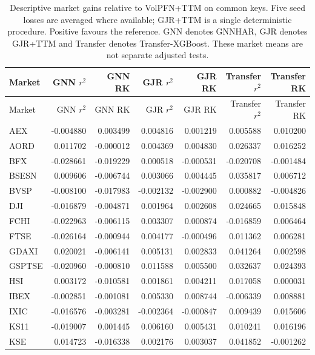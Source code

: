 \begingroup\footnotesize\setlength{\tabcolsep}{3pt}
\begin{longtable}{@{}lrrrrrr@{}}
\caption[Realised-risk gains by market]{Descriptive market gains relative to VolPFN+TTM on common keys. Five seed losses are averaged where available; GJR+TTM is a single deterministic procedure. Positive favours the reference. GNN denotes GNNHAR, GJR denotes GJR+TTM and Transfer denotes Transfer-XGBoost. These market means are not separate adjusted tests.}\label{tab:new-intraday-markets}\\
\toprule
Market & GNN $r^2$ & GNN RK & GJR $r^2$ & GJR RK & Transfer $r^2$ & Transfer RK \\
\midrule\endfirsthead
\toprule
Market & GNN $r^2$ & GNN RK & GJR $r^2$ & GJR RK & Transfer $r^2$ & Transfer RK \\
\midrule\endhead
AEX & -0.004880 & 0.003499 & 0.004816 & 0.001219 & 0.005588 & 0.010200 \\
AORD & 0.011702 & -0.000012 & 0.004369 & 0.004830 & 0.026337 & 0.016252 \\
BFX & -0.028661 & -0.019229 & 0.000518 & -0.000531 & -0.020708 & -0.001484 \\
BSESN & 0.009606 & -0.006744 & 0.003066 & 0.004445 & 0.035817 & 0.006712 \\
BVSP & -0.008100 & -0.017983 & -0.002132 & -0.002900 & 0.000882 & -0.004826 \\
DJI & -0.016879 & -0.004871 & 0.001964 & 0.002608 & 0.024665 & 0.015848 \\
FCHI & -0.022963 & -0.006115 & 0.003307 & 0.000874 & -0.016859 & 0.006464 \\
FTSE & -0.026164 & -0.000944 & 0.004177 & -0.000496 & 0.011362 & 0.006281 \\
GDAXI & 0.020021 & -0.006141 & 0.005131 & 0.002833 & 0.041264 & 0.002598 \\
GSPTSE & -0.020960 & -0.000810 & 0.011588 & 0.005500 & 0.032637 & 0.024393 \\
HSI & 0.003172 & -0.010581 & 0.001861 & 0.004211 & 0.017058 & 0.000031 \\
IBEX & -0.002851 & -0.001081 & 0.005330 & 0.008744 & -0.006339 & 0.008881 \\
IXIC & -0.016576 & -0.003281 & -0.002364 & -0.000847 & 0.009439 & 0.015606 \\
KS11 & -0.019007 & 0.001445 & 0.006160 & 0.005431 & 0.010241 & 0.016196 \\
KSE & 0.014723 & -0.016338 & 0.002176 & 0.003037 & 0.041852 & -0.001262 \\

\end{longtable}

